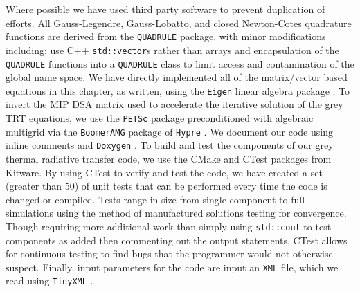 Where possible we have used third party software to prevent duplication of  efforts.
All Gauss-Legendre, Gauss-Lobatto, and closed Newton-Cotes quadrature functions are derived from the \verb+QUADRULE+ \cite{quadrule} package, with minor modifications including: use C++ \verb+std::vector+s rather than arrays and encapsulation of the \verb+QUADRULE+ functions into a \verb+QUADRULE+ class to limit access and contamination of the global name space.
We have directly implemented all of the matrix/vector based equations in this chapter, as written, using the \verb+Eigen+ linear algebra package \cite{eigen}.
To invert the MIP DSA matrix used to accelerate the iterative solution of the grey TRT equations, we use the \verb+PETSc+ package\cite{petsc} preconditioned with algebraic multigrid\cite{mip_mc} via the \verb+BoomerAMG+ package of \verb+Hypre+ \cite{hypre}.
We document our code using  inline comments  and \verb+Doxygen+ \cite{doxygen}.
To build and test the components of our grey thermal radiative transfer code, we use the CMake and CTest packages from Kitware\cite{cmake}.
By using CTest to verify and test the code, we have created a set (greater than 50) of unit tests that can be performed every time the code is changed or compiled.
Tests range in size from single component to full simulations using the method of manufactured solutions\cite{mms} testing for convergence.
Though requiring more additional work than simply using \verb+std::cout+ to test components as added then commenting out the output statements, CTest allows for continuous testing to find bugs that the programmer would not otherwise suspect.
Finally, input parameters for the code are input an \verb+XML+ file, which we read using \verb+TinyXML+ \cite{xml}. 
